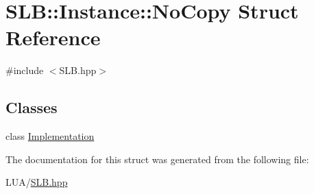 \hypertarget{structSLB_1_1Instance_1_1NoCopy}{}\section{S\+LB\+:\+:Instance\+:\+:No\+Copy Struct Reference}
\label{structSLB_1_1Instance_1_1NoCopy}


{\ttfamily \#include $<$S\+L\+B.\+hpp$>$}

\subsection*{Classes}
\begin{DoxyCompactItemize}
\item 
class \hyperlink{classSLB_1_1Instance_1_1NoCopy_1_1Implementation}{Implementation}
\end{DoxyCompactItemize}


The documentation for this struct was generated from the following file\+:\begin{DoxyCompactItemize}
\item 
L\+U\+A/\hyperlink{SLB_8hpp}{S\+L\+B.\+hpp}\end{DoxyCompactItemize}
